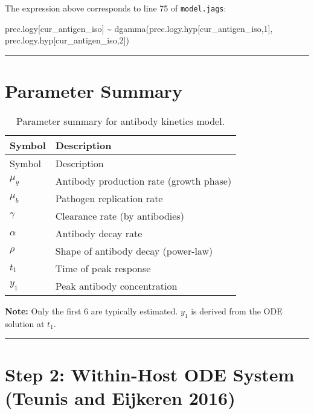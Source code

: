 \documentclass[
]{article}
\newenvironment{Shaded}{\begin{snugshade}}{\end{snugshade}}
\newcommand{\DecValTok}[1]{\textcolor[rgb]{0.68,0.00,0.00}{#1}}
\newcommand{\FunctionTok}[1]{\textcolor[rgb]{0.28,0.35,0.67}{#1}}
\newcommand{\NormalTok}[1]{\textcolor[rgb]{0.00,0.23,0.31}{#1}}
\newcommand{\SpecialCharTok}[1]{\textcolor[rgb]{0.37,0.37,0.37}{#1}}
\begin{document}
The expression above corresponds to line 75 of \texttt{model.jags}:

\begin{Shaded}
\begin{Highlighting}[numbers=left,,firstnumber=75,]
\NormalTok{  prec.logy[cur\_antigen\_iso] }\SpecialCharTok{\textasciitilde{}} \FunctionTok{dgamma}\NormalTok{(prec.logy.hyp[cur\_antigen\_iso,}\DecValTok{1}\NormalTok{], prec.logy.hyp[cur\_antigen\_iso,}\DecValTok{2}\NormalTok{])}
\end{Highlighting}
\end{Shaded}

\begin{center}\rule{0.5\linewidth}{0.5pt}\end{center}

\section{Parameter Summary}\label{parameter-summary}

\begin{longtable}[]{@{}ll@{}}
\caption{Parameter summary for antibody kinetics
model.}\label{tbl-param-summary}\tabularnewline
\toprule\noalign{}
Symbol & Description \\
\midrule\noalign{}
\endfirsthead
\toprule\noalign{}
Symbol & Description \\
\midrule\noalign{}
\endhead
\bottomrule\noalign{}
\endlastfoot
\(\mu_y\) & Antibody production rate (growth phase) \\
\(\mu_b\) & Pathogen replication rate \\
\(\gamma\) & Clearance rate (by antibodies) \\
\(\alpha\) & Antibody decay rate \\
\(\rho\) & Shape of antibody decay (power-law) \\
\(t_1\) & Time of peak response \\
\(y_1\) & Peak antibody concentration \\
\end{longtable}

\textbf{Note:} Only the first 6 are typically estimated. \(y_1\) is
derived from the ODE solution at \(t_1\).

\begin{center}\rule{0.5\linewidth}{0.5pt}\end{center}

\section{Step 2: Within-Host ODE System (Teunis and Eijkeren
2016)}\label{step-2-within-host-ode-system-teunis2016}
\end{document}
